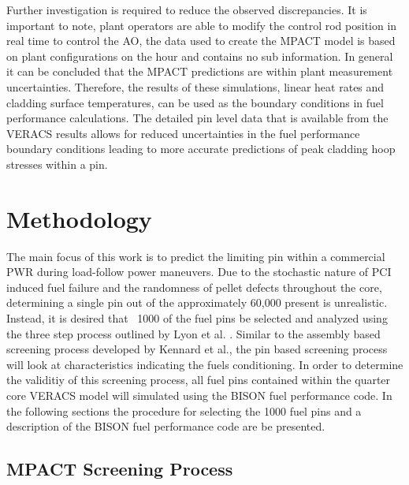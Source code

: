 \documentclass[edeposit,fullpage,11pt]{uiucthesis2009}
\begin{document}
Further investigation is required to reduce the observed discrepancies.
It is important to note, plant operators are able to modify the control rod position in real time to control the \gls{AO}, the data used to create the MPACT model is based on plant configurations on the hour and contains no sub information.
In general it can be concluded that the MPACT predictions are within plant measurement uncertainties.
Therefore, the results of these simulations, linear heat rates and cladding surface temperatures, can be used as the boundary conditions in fuel performance calculations.
The detailed pin level data that is available from the \gls{VERACS} results allows for reduced uncertainties in the fuel performance boundary conditions leading to more accurate predictions of peak cladding hoop stresses within a pin.

\chapter{Methodology}
The main focus of this work is to predict the limiting pin within a commercial \gls{PWR} during load-follow power maneuvers.
Due to the stochastic nature of \gls{PCI} induced fuel failure and the randomness of pellet defects throughout the core, determining a single pin out of the approximately 60,000 present is unrealistic.
Instead, it is desired that ~1000 of the fuel pins be selected and analyzed using the three step process outlined by Lyon et al. \cite{lyon_pci_2009}.
Similar to the assembly based screening process developed by Kennard et al., the pin based screening process will look at characteristics indicating the fuels conditioning.
In order to determine the validitiy of this screening process, all fuel pins contained within the quarter core \gls{VERACS} model will simulated using the BISON fuel performance code.
In the following sections the procedure for selecting the 1000 fuel pins and a description of the BISON fuel performance code are be presented.

\section{MPACT Screening Process}
\end{document}
